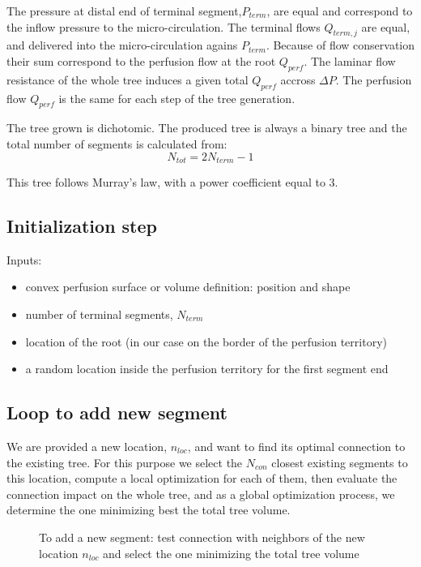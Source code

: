 \documentclass[a4paper, 11pt]{article} %
\begin{document}
The pressure at distal end of terminal segment,$P_{term}$, are equal and correspond to the inflow pressure to the micro-circulation.
The terminal flows $Q_{term,j}$ are equal, and delivered into the micro-circulation agains $P_{term}$. Because of flow conservation their sum correspond to the perfusion flow at the root $Q_{perf}$. 
The laminar flow resistance of the whole tree induces a given total $Q_{perf}$ accross $\Delta P$. The perfusion flow $Q_{perf}$ is the same for each step of the tree generation.

The tree grown is dichotomic. The produced tree is always a binary tree and the total number of segments is calculated from:
\begin{equation}
N_{tot} = 2 N_{term} -1
\end{equation}

This tree follows Murray's law, with a power coefficient equal to 3.

\subsection{Initialization step}  
Inputs:
\begin{itemize}
\item convex perfusion surface or volume definition: position and shape
\item number of terminal segments, $N_{term}$
\item location of the root (in our case on the border of the perfusion territory)
\item a random location inside the perfusion territory for the first segment end 
\end{itemize}

\subsection{Loop to add new segment}
We are provided a new location, $n_{loc}$, and want to find its optimal connection to the existing tree. For this purpose we select the $N_{con}$ closest existing segments to this location, compute a local optimization for each of them, then evaluate the connection impact on the whole tree, and as a global optimization process, we determine the one minimizing best the total tree volume.

\begin{figure}[!h]
\centering
{}
\caption{To add a new segment: test connection with neighbors of the new location $n_{loc}$ and select the one minimizing the total tree volume}
\label{fig:test neighbors}
\end{figure}
\end{document}
